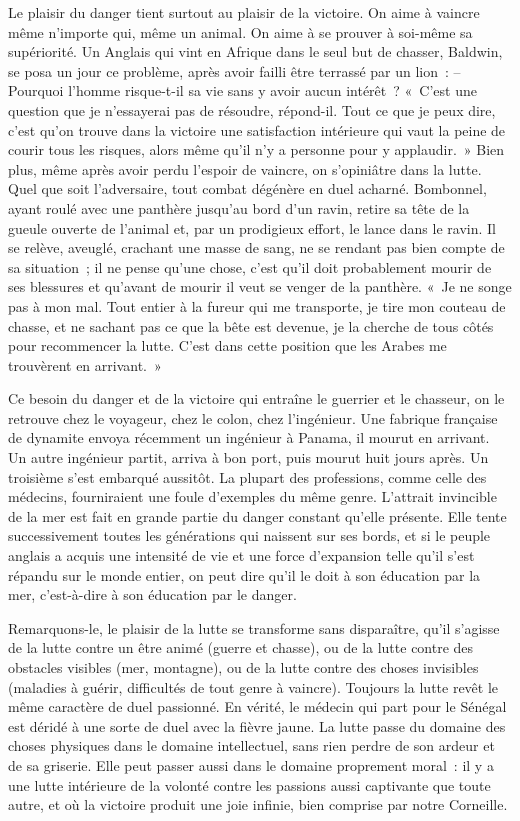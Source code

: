 \documentclass[french,twoside]{book} %
\begin{document}
Le plaisir du danger tient surtout au plaisir de la victoire. On aime à vaincre même n’importe qui, même un animal. On aime à se prouver à soi-même sa supériorité. Un Anglais qui vint en Afrique dans le seul but de chasser, Baldwin, se posa un jour ce problème, après avoir failli être terrassé par un lion : – Pourquoi l’homme risque-t-il sa vie sans y avoir aucun intérêt ? « C’est une question que je n’essayerai pas de résoudre, répond-il. Tout ce que je peux dire, c’est qu’on trouve dans la victoire une satisfaction intérieure qui vaut la peine de courir tous les risques, alors même qu’il n’y a personne pour y applaudir. » Bien plus, même après avoir perdu l’espoir de vaincre, on s’opiniâtre dans la lutte. Quel que soit l’adversaire, tout combat dégénère en duel acharné. Bombonnel, ayant roulé avec une panthère jusqu’au bord d’un ravin, retire sa tête de la gueule ouverte de l’animal et, par un prodigieux effort, le lance dans le ravin. Il se relève, aveuglé, crachant une masse de sang, ne se rendant pas bien compte de sa situation ; il ne pense qu’une chose, c’est qu’il doit probablement mourir de ses blessures et qu’avant de mourir il veut se venger de la panthère. « Je ne songe pas à mon mal. Tout entier à la fureur qui me transporte, je tire mon couteau de chasse, et ne sachant pas ce que la bête est devenue, je la cherche de tous côtés pour recommencer la lutte. C’est dans cette position que les Arabes me trouvèrent en arrivant. »\par
Ce besoin du danger et de la victoire qui entraîne le guerrier et le chasseur, on le retrouve chez le voyageur, chez le colon, chez l’ingénieur. Une fabrique française de dynamite envoya récemment un ingénieur à Panama, il mourut en arrivant. Un autre ingénieur partit, arriva à bon port, puis mourut huit jours après. Un troisième s’est embarqué aussitôt. La plupart des professions, comme celle des médecins, fourniraient une foule d’exemples du même genre. L’attrait invincible de la mer est fait en grande partie du danger constant qu’elle présente. Elle tente successivement toutes les générations qui naissent sur ses bords, et si le peuple anglais a acquis une intensité de vie et une force d’expansion telle qu’il s’est répandu sur le monde entier, on peut dire qu’il le doit à son éducation par la mer, c’est-à-dire à son éducation par le danger.\par
Remarquons-le, le plaisir de la lutte se transforme sans disparaître, qu’il s’agisse de la lutte contre un être animé (guerre et chasse), ou de la lutte contre des obstacles visibles (mer, montagne), ou de la lutte contre des choses invisibles (maladies à guérir, difficultés de tout genre à vaincre). Toujours la lutte revêt le même caractère de duel passionné. En vérité, le médecin qui part pour le Sénégal est déridé à une sorte de duel avec la fièvre jaune. La lutte passe du domaine des choses physiques dans le domaine intellectuel, sans rien perdre de son ardeur et de sa griserie. Elle peut passer aussi dans le domaine proprement moral : il y a une lutte intérieure de la volonté contre les passions aussi captivante que toute autre, et où la victoire produit une joie infinie, bien comprise par notre Corneille.\par
\end{document}
